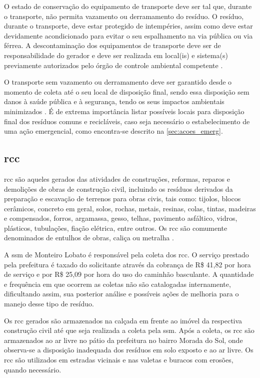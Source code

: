	O estado de conservação do equipamento de transporte deve ser tal que, durante o transporte, não permita vazamento ou derramamento do resíduo. O resíduo, durante o transporte, deve estar protegido de intempéries,  assim como deve estar devidamente
	acondicionado para evitar o seu espalhamento na via pública ou via férrea. A descontaminação dos equipamentos de transporte deve ser de responsabilidade do gerador e deve ser realizada em local(is) e sistema(s) previamente autorizados pelo órgão de controle ambiental competente \cite{abnt:13221:2003}.
	
	O transporte sem vazamento ou derramamento deve ser garantido desde o momento de coleta até o seu local de disposição final, sendo essa disposição sem danos à saúde pública e à  segurança, tendo os seus impactos ambientais minimizados \cite{abnt:8419}. É de extrema importância listar possíveis locais para disposição final dos resíduos comuns e recicláveis, caso seja necessário o estabelecimento de uma ação emergencial, como encontra-se descrito na \autoref{sec:acoes_emerg}. %
	
	
	\subsection{\gls{rcc}}
	\label{subsec:trans_rcc}
	\gls{rcc} são aqueles gerados das atividades de construções, reformas, reparos e demolições de obras de construção civil, incluindo os resíduos derivados da preparação e escavação de terrenos para obras civis, tais como: tijolos, blocos cerâmicos, concreto em geral, solos, rochas, metais, resinas, colas, tintas, madeiras e compensados, forros, argamassa, gesso, telhas, pavimento asfáltico, vidros, plásticos, tubulações, fiação elétrica, entre outros. Os \gls{rcc} são comumente denominados de entulhos de obras, caliça ou metralha \cite{brasil:12305, conama:307}. 
	
	A \gls{ssm} de Monteiro Lobato é responsável pela coleta dos \gls{rcc}. O serviço prestado pela prefeitura é taxado do solicitante através da cobrança de R\$ 41,82 por hora de serviço e por R\$ 25,09 por hora do uso do caminhão basculante. A quantidade e frequência em que ocorrem as coletas não são catalogadas internamente, dificultando assim, sua posterior análise e possíveis ações de melhoria para o manejo desse tipo de resíduo.
		
	Os \gls{rcc} gerados são armazenados na calçada em frente ao imóvel da respectiva construção civil até que seja realizada a coleta pela \gls{ssm}. Após a coleta, os \gls{rcc} são armazenados ao ar livre no pátio da prefeitura no bairro Morada do Sol,  onde observa-se a disposição inadequada dos resíduos em solo exposto e ao ar livre. Os \gls{rcc} são utilizados em estradas vicinais e nas valetas e buracos com erosões, quando necessário.
	

